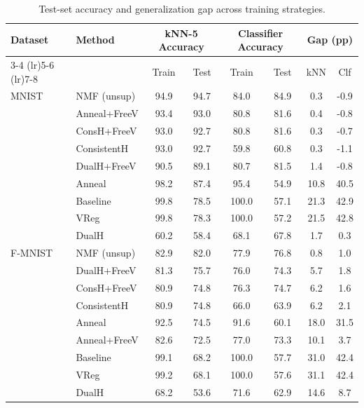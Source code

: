 \begin{table}[t]
\caption{Test-set accuracy and generalization gap across training strategies.}
\label{tab:generalization}
\centering
\small
\begin{tabular}{llcccccc}
\toprule
Dataset & Method & \multicolumn{2}{c}{kNN-5 Accuracy} & \multicolumn{2}{c}{Classifier Accuracy} & \multicolumn{2}{c}{Gap (pp)} \\
\cmidrule(lr){3-4} \cmidrule(lr){5-6} \cmidrule(lr){7-8}
 & & Train & Test & Train & Test & kNN & Clf \\
\midrule
MNIST & NMF (unsup) & 94.9 & 94.7 & 84.0 & 84.9 & 0.3 & -0.9 \\
 & Anneal+FreeV & 93.4 & 93.0 & 80.8 & 81.6 & 0.4 & -0.8 \\
 & ConsH+FreeV & 93.0 & 92.7 & 80.8 & 81.6 & 0.3 & -0.7 \\
 & ConsistentH & 93.0 & 92.7 & 59.8 & 60.8 & 0.3 & -1.1 \\
 & DualH+FreeV & 90.5 & 89.1 & 80.7 & 81.5 & 1.4 & -0.8 \\
 & Anneal & 98.2 & 87.4 & 95.4 & 54.9 & 10.8 & 40.5 \\
 & Baseline & 99.8 & 78.5 & 100.0 & 57.1 & 21.3 & 42.9 \\
 & VReg & 99.8 & 78.3 & 100.0 & 57.2 & 21.5 & 42.8 \\
 & DualH & 60.2 & 58.4 & 68.1 & 67.8 & 1.7 & 0.3 \\
\midrule
F-MNIST & NMF (unsup) & 82.9 & 82.0 & 77.9 & 76.8 & 0.8 & 1.0 \\
 & DualH+FreeV & 81.3 & 75.7 & 76.0 & 74.3 & 5.7 & 1.8 \\
 & ConsH+FreeV & 80.9 & 74.8 & 76.3 & 74.7 & 6.2 & 1.6 \\
 & ConsistentH & 80.9 & 74.8 & 66.0 & 63.9 & 6.2 & 2.1 \\
 & Anneal & 92.5 & 74.5 & 91.6 & 60.1 & 18.0 & 31.5 \\
 & Anneal+FreeV & 82.6 & 72.5 & 77.0 & 73.3 & 10.1 & 3.7 \\
 & Baseline & 99.1 & 68.2 & 100.0 & 57.7 & 31.0 & 42.4 \\
 & VReg & 99.2 & 68.1 & 100.0 & 57.6 & 31.1 & 42.4 \\
 & DualH & 68.2 & 53.6 & 71.6 & 62.9 & 14.6 & 8.7 \\
\bottomrule
\end{tabular}
\end{table}
